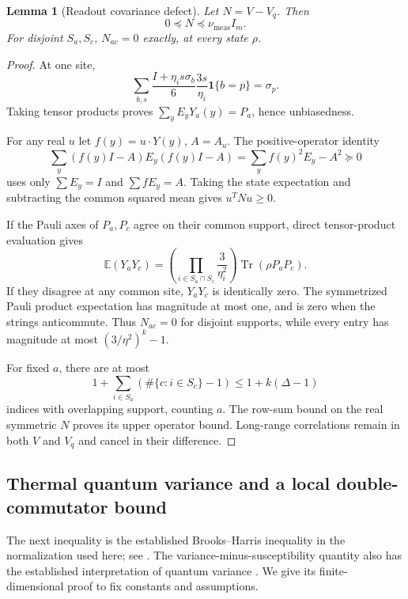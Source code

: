 \documentclass[11pt,a4paper]{article}
\newtheorem{lemma}[theorem]{Lemma}
\theoremstyle{remark}
\newcommand{\Tr}{\operatorname{Tr}}
\newcommand{\E}{\mathbb E}
\begin{document}
\begin{lemma}[Readout covariance defect]\label{lem:measurement}
Let $N=V-V_q$. Then
\begin{equation}
 0\preceq N\preceq\nu_{\mathrm{meas}}I_m.
 \label{eq:N}
\end{equation}
For disjoint $S_a,S_c$, $N_{ac}=0$ exactly, at every state $\rho$.
\end{lemma}
\begin{proof}
At one site,
\[
 \sum_{b,s}\frac{I+\eta_i s\sigma_b}{6}
 \frac{3s}{\eta_i}\mathbf1\{b=p\}=\sigma_p.
\]
Taking tensor products proves $\sum_yE_yY_a(y)=P_a$, hence unbiasedness.

For any real $u$ let $f(y)=u\cdot Y(y)$, $A=A_u$. The positive-operator identity
\begin{equation}
 \sum_y(f(y)I-A)E_y(f(y)I-A)
 =\sum_y f(y)^2E_y-A^2\succeq0
 \label{eq:kadison}
\end{equation}
uses only $\sum E_y=I$ and $\sum fE_y=A$. Taking the state expectation and subtracting the common squared mean gives $u^TNu\ge0$.

If the Pauli axes of $P_a,P_c$ agree on their common support, direct tensor-product evaluation gives
\begin{equation}
 \E(Y_aY_c)=
 \left(\prod_{i\in S_a\cap S_c}\frac3{\eta_i^2}\right)\Tr(\rho P_aP_c).
 \label{eq:seconds}
\end{equation}
If they disagree at any common site, $Y_aY_c$ is identically zero. The symmetrized Pauli product expectation has magnitude at most one, and is zero when the strings anticommute. Thus $N_{ac}=0$ for disjoint supports, while every entry has magnitude at most $(3/\eta^2)^k-1$.

For fixed $a$, there are at most
\[
 1+\sum_{i\in S_a}(\#\{c:i\in S_c\}-1)\le 1+k(\Delta-1)
\]
indices with overlapping support, counting $a$. The row-sum bound on the real symmetric $N$ proves its upper operator bound. Long-range correlations remain in both $V$ and $V_q$ and cancel in their difference.
\end{proof}

\subsection{Thermal quantum variance and a local double-commutator bound}

The next inequality is the established Brooks--Harris inequality in the normalization used here; see \cite{BrankovTonchev}. The variance-minus-susceptibility quantity also has the established interpretation of quantum variance \cite{FrerotRoscilde}. We give its finite-dimensional proof to fix constants and assumptions.
\end{document}
